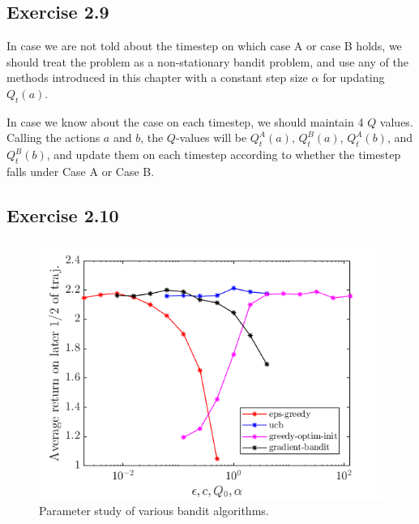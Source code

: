 \documentclass[10pt]{article}
\begin{document}
	\subsection*{Exercise 2.9}
	\label{ss:2.9}
	In case we are not told about the timestep on which case A or case B holds, we should treat the problem as a non-stationary bandit problem, and use any of the methods introduced in this chapter with a constant step size $\alpha$ for updating $Q_t(a)$.\par\noindent
	In case we know about the case on each timestep, we should maintain 4 $Q$ values. Calling the actions $a$ and $b$, the $Q$-values will be $Q_t^A(a)$, $Q_t^B(a)$, $Q_t^A(b)$, and $Q_t^B(b)$, and update them on each timestep according to whether the timestep falls under Case A or Case B.
	\subsection*{Exercise 2.10}
	\label{ss:2.10}
	\begin{figure}[H]
		\centering
		\includegraphics[width=0.5\linewidth]{ex_2_10_fig_1}
		\caption{Parameter study of various bandit algorithms.}
	\end{figure}
\end{document}
